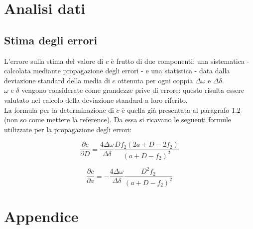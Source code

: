 \documentclass[]{article}
\let\oldsection\section%
\renewcommand{\section}{%
	\renewcommand{\theequation}{\thesection.\arabic{equation}}%
	\oldsection}%
\let\oldsubsection\subsection%
\renewcommand{\subsection}{%
	\renewcommand{\theequation}{\thesubsection.\arabic{equation}}%
	\oldsubsection}%
\begin{document}
    \section {Analisi dati}

    \subsection {Stima degli errori}


    L'errore sulla stima del valore di $ c $ è frutto di due componenti: una sistematica 
    - calcolata mediante propagazione degli errori - e una statistica - data dalla deviazione standard 
    della media di $ c $ ottenuta per ogni coppia $ \Delta \omega $ e $ \Delta \delta $. \\

    $\omega$ e $\delta$ vengono considerate come grandezze prive di errore: questo risulta essere valutato nel calcolo della deviazione standard a loro riferito.\\

    La formula per la determinazione di $ c $ è quella già presentata al paragrafo 1.2 (non so come mettere la reference).
    Da essa si ricavano le seguenti formule utilizzate per la propagazione degli errori:

    \begin{equation}
        \label{eqn:propD}
        \frac{\partial c}{\partial D} = \frac{4\Delta \omega}{\Delta \delta} \frac{D f_2 (2a + D -2f_2)}{(a + D -f_2)^2}
        \end{equation}

    \begin{equation}
        \label{eqn:propa}
        \frac{\partial c}{\partial a} = -\frac{4\Delta \omega}{\Delta \delta} \frac{D^2 f_2}{(a + D -f_2)^2}
        \end{equation}


    \section{Appendice}
\end{document}
